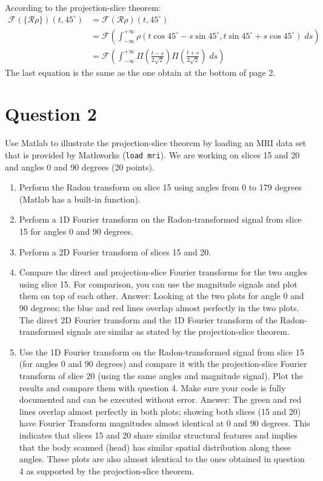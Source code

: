 \documentclass[12pt,twoside]{article}
\begin{document}
\begin{enumerate}
According to the projection-slice theorem:
\begin{align*}
    \mathcal{F} \left( \{ \mathcal{R} \rho \} \right)(t,  45^{\circ}) &= \mathcal{F} \left( \mathcal{R} \rho  \right)(t, 45^{\circ}) \\
    &= \mathcal{F} \left( \int_{-\infty}^{+\infty} \rho \left(t \cos{45^{\circ}} - s \sin {45^{\circ}}, t  \sin {45^{\circ}} + s \cos{45^{\circ}} \right) \; ds \right) \\
    &= \mathcal{F} \left( \int_{-\infty}^{+\infty} \Pi\left(\frac{t - s}{2 \sqrt{2}}\right) \Pi\left(\frac{t + s}{2 \sqrt{2}}\right) \; ds \right)
\end{align*}
The last equation is the same as the one obtain at the bottom of page 2.

  \end{enumerate}
\section*{Question 2}

\noindent
Use Matlab to illustrate the projection-slice theorem by loading an MRI data set that is provided by Mathworks (\texttt{load mri}). 
We are working on slices 15 and 20 and angles 0 and 90 degrees (20 points).

\begin{enumerate}
    \item Perform the Radon transform on slice 15 using angles from 0 to 179 degrees (Matlab has a built-in function).
    \item Perform a 1D Fourier transform on the Radon-transformed signal from slice 15 for angles 0 and 90 degrees.
    \item Perform a 2D Fourier transform of slices 15 and 20.
    \item Compare the direct and projection-slice Fourier transforms for the two angles using slice 15. 
    For comparison, you can use the magnitude signals and plot them on top of each other.
    Answer: Looking at the two plots for angle 0 and 90 degrees; 
    the blue and red lines overlap almost perfectly in the two plots. The direct 2D Fourier transform and the 1D Fourier transform of the Radon-transformed signals
    are similar as stated by the projection-slice theorem.
    \item Use the 1D Fourier transform on the Radon-transformed signal from slice 15 (for angles 0 and 90 degrees) and 
    compare it with the projection-slice Fourier transform of slice 20 (using the same angles and magnitude signal). 
    Plot the results and compare them with question 4.
    Make sure your code is fully documented and can be executed without error.
    Answer: 
    The green and red lines overlap almost perfectly in both plots; showing both slices (15 and 20) have Fourier Transform magnitudes almost identical at 0 and 90 degrees.
    This indicates that slices 15 and 20 share similar structural features and implies that the body scanned (head) has similar spatial distribution along these angles.
    These plots are also almost identical to the ones obtained in question 4 as supported by the projection-slice theorem.
\end{enumerate}
\end{document}
